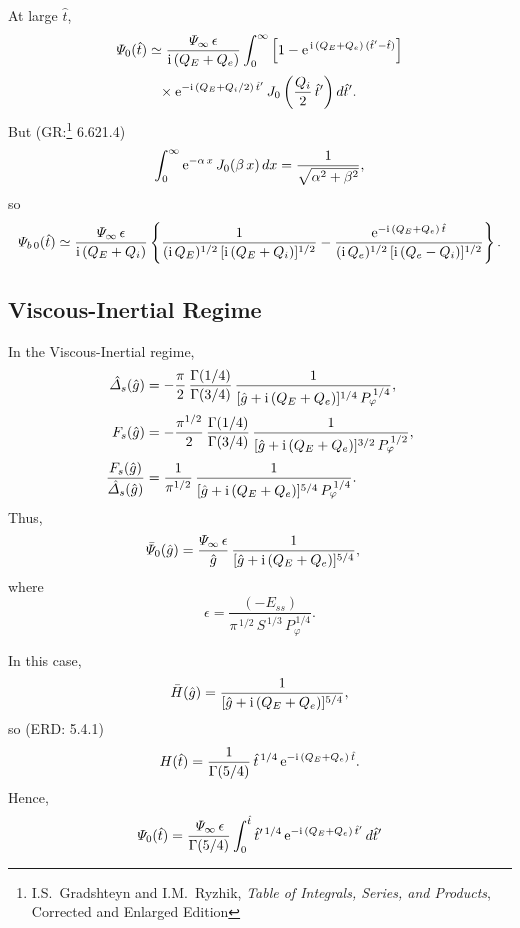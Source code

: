 \documentclass[titlepage=false,12pt]{article}
\begin{document}
At large $\hat{t}$,
\begin{align}
{\mit\Psi}_0(\hat{t}) &\simeq \frac{{\mit\Psi}_{\infty}\,\epsilon}{{\rm i}\,(Q_E+Q_e)}
\int_0^{\infty}\left[1-{\rm e}^{\,{\rm i}\,(Q_E+Q_e)\,(\hat{t}'-\hat{t})}\right]\nonumber\\[0.5ex]&\phantom{=}\times 
{\rm e}^{-{\rm i}\,(Q_E+Q_i/2)\,\hat{t}'}\,J_0\left(\frac{Q_i}{2}\,\hat{t}'\right)d\hat{t}'.
\end{align}
But (GR:\footnote{I.S.~Gradshteyn and I.M.~Ryzhik, {\em Table of Integrals, Series, and Products}, Corrected and Enlarged Edition} 6.621.4)
\begin{equation}
\int_0^\infty {\rm e}^{-\alpha\,x}\,J_0(\beta\,x)\,dx =\frac{1}{\sqrt{\alpha^2+\beta^2}},
\end{equation}
so
\begin{equation}
{\mit\Psi}_{b\,0}(\hat{t})\simeq \frac{{\mit\Psi}_{\infty}\,\epsilon}{{\rm i}\,(Q_E+Q_i)}\left\{
\frac{1}{({\rm i}\,Q_E)^{1/2}\,[{\rm i}\,(Q_E+Q_i)]^{1/2}}- \frac{{\rm e}^{-{\rm i}\,(Q_E+Q_e)\,\hat{t}}}{({\rm i}\,Q_e)^{1/2}\,[{\rm i}\,(Q_e-Q_i)]^{1/2}}\right\}.
\end{equation}

\subsection{Viscous-Inertial Regime}
In the Viscous-Inertial regime, 
\begin{align}
\hat{\mit\Delta}_s(\hat{g})& = -\frac{\pi}{2}\,\frac{\Gamma(1/4)}{\Gamma(3/4)}\,\frac{1}{[\hat{g}+{\rm i}\,(Q_E+Q_e)]^{1/4}\,P_\varphi^{\,1/4}},\\[0.5ex]
F_s(\hat{g})&=-\frac{\pi^{1/2}}{2}\,\frac{\Gamma(1/4)}{\Gamma(3/4)}\,\frac{1}{[\hat{g}+{\rm i}\,(Q_E+Q_e)]^{3/2}\,P_\varphi^{\,1/2}},\\[0.5ex]
\frac{F_s(\hat{g})}{\hat{\mit\Delta}_s(\hat{g})}&= \frac{1}{\pi^{1/2}}\,\frac{1}{[\hat{g}+{\rm i}\,(Q_E+Q_e)]^{5/4}\,P_\varphi^{\,1/4}}.
\end{align}
Thus,
\begin{align}
\bar{\mit\Psi}_0(\hat{g}) &=
\frac{ {\mit\Psi}_\infty\,\epsilon}{\hat{g}}\,\frac{1}{[\hat{g}+{\rm i}\,(Q_E+Q_e)]^{5/4}},
\end{align}
where
\begin{equation}
\epsilon = \frac{(-E_{ss})}{\pi^{\,1/2}\,S^{\,1/3}\,P_\varphi^{\,1/4}}.
\end{equation}

In this case,
\begin{equation}
\bar{H}(\hat{g}) = \frac{1}{[\hat{g}+{\rm i}\,(Q_E+Q_e)]^{5/4}},
\end{equation}
so (ERD: 5.4.1)
\begin{equation}
H(\hat{t}) = \frac{1}{\Gamma(5/4)}\,\hat{t}^{\,1/4}\,{\rm e}^{-{\rm i}\,(Q_E+Q_e)\,\hat{t}}.
\end{equation}
Hence,
\begin{equation}
{\mit\Psi}_0(\hat{t}) =\frac{\, {\mit\Psi}_\infty\,\epsilon}{\Gamma(5/4)}\int_0^{\hat{t}}
\hat{t}'^{\,1/4}\,{\rm e}^{-{\rm i}\,(Q_E+Q_e)\,\hat{t}'}\,d\hat{t}'
\end{equation}
\end{document}
